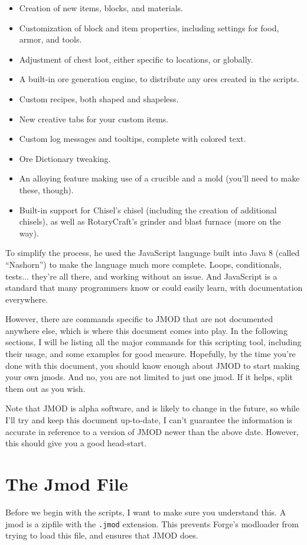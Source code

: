 \documentclass[letterpaper,titlepage,12pt]{article}
\begin{document}
\begin{itemize}
\item Creation of new items, blocks, and materials.
\item Customization of block and item properties, including settings for food, armor, and tools.
\item Adjustment of chest loot, either specific to locations, or globally.
\item A built-in ore generation engine, to distribute any ores created in the scripts.
\item Custom recipes, both shaped and shapeless.
\item New creative tabs for your custom items.
\item Custom log messages and tooltips, complete with colored text.
\item Ore Dictionary tweaking.
\item An alloying feature making use of a crucible and a mold (you'll need to make these, though).
\item Built-in support for Chisel's chisel (including the creation of additional chisels), as well as RotaryCraft's grinder and blast furnace (more on the way).
\end{itemize}

To simplify the process, he used the JavaScript language built into Java 8 (called ``Nashorn'') to make the language much more complete.  Loops, conditionals, tests... they're all there, and working without an issue.  And JavaScript is a standard that many programmers know or could easily learn, with documentation everywhere.

However, there are commands specific to JMOD that are not documented anywhere else, which is where this document comes into play.  In the following sections, I will be listing all the major commands for this scripting tool, including their usage, and some examples for good measure.  Hopefully, by the time you're done with this document, you should know enough about JMOD to start making your own jmods.  And no, you are not limited to just one jmod.  If it helps, split them out as you wish.

Note that JMOD is alpha software, and is likely to change in the future, so while I'll try and keep this document up-to-date, I can't guarantee the information is accurate in reference to a version of JMOD newer than the above date.  However, this should give you a good head-start.

\section{The Jmod File}
Before we begin with the scripts, I want to make sure you understand this.  A jmod is a zipfile with the \texttt{.jmod} extension.  This prevents Forge's modloader from trying to load this file, and ensures that JMOD does.
\end{document}
